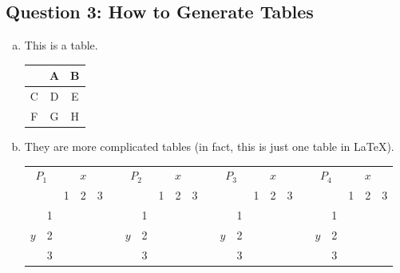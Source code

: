 \documentclass{article}
\begin{document}
\begin{enumerate}[(a)]
\newpage


\section{Question 3: How to Generate Tables}

\begin{enumerate}[(a)]

\item This is a table.
\begin{center}
\begin{tabular}{|c||c|c|}\hline
		& A		& B		\\\hline\hline
	C	& D		& E		\\\hline
	F	& G		& H		\\\hline
\end{tabular}
\end{center}

\item They are more complicated tables (in fact, this is just one table in \LaTeX).
\begin{center}
\begin{tabular}{|c|c|c|c|c|c|c|c|c|c|c|c|c|c|c|c|c|c|c|c|c|c|c|} \cline{1-5}\cline{7-11}\cline{13-17}\cline{19-23}
	\multicolumn{2}{|c|}{$P_1$} & \multicolumn{3}{|c|}{$x$} & & \multicolumn{2}{|c|}{$P_2$} & \multicolumn{3}{|c|}{$x$} & & \multicolumn{2}{|c|}{$P_3$} & \multicolumn{3}{|c|}{$x$} & & \multicolumn{2}{|c|}{$P_4$} & \multicolumn{3}{|c|}{$x$} \\\cline{3-5}\cline{9-11}\cline{15-17}\cline{21-23}
	\multicolumn{2}{|c|}{} & 1 & 2 & 3 & & \multicolumn{2}{|c|}{} & 1 & 2 & 3 & & \multicolumn{2}{|c|}{} & 1 & 2 & 3 & & \multicolumn{2}{|c|}{} & 1 & 2 & 3 \\\cline{1-5}\cline{7-11}\cline{13-17}\cline{19-23}
		& 1 &   &   &   & &     & 1 &   &   &   & &     & 1 &   &   &   & &     & 1 &   &   &   \\\cline{2-5}\cline{8-11}\cline{14-17}\cline{20-23}
	$y$	& 2 &   &   &   & & $y$ & 2 &   &   &   & & $y$ & 2 &   &   &   & & $y$ & 2 &   &   &   \\\cline{2-5}\cline{8-11}\cline{14-17}\cline{20-23}
		& 3 &   &   &   & &     & 3 &   &   &   & &     & 3 &   &   &   & &     & 3 &   &   &   \\\cline{1-5}\cline{7-11}\cline{13-17}\cline{19-23}
\end{tabular}
\end{center}


\end{enumerate}
\end{enumerate}
\end{document}

